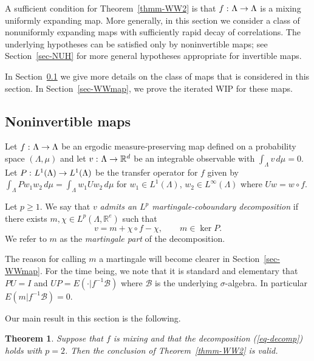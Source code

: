 \documentclass[aop,MSNbibl,seceqn,dvips]{arximspdf}
\newcommand{\eqref}[1]{(\ref{#1})}
\newtheorem{thmm}{Theorem}[section]
\newcommand{\R}{\mathbb{R}}
\begin{document}
A sufficient condition for Theorem~\ref{thmm-WW2}
is that $f\dvtx\Lambda\to\Lambda$ is a mixing uniformly expanding map.
More generally, in this section we consider a class of nonuniformly
expanding maps with sufficiently rapid decay of correlations.
The underlying hypotheses can be satisfied only by noninvertible maps;
see Section~\ref{sec-NUH} for more general hypotheses appropriate for
invertible maps.

In Section~\ref{sec-mild} we give more details on the class of maps
that is considered in this section. In Section~\ref{sec-WWmap}, we
prove the iterated WIP for these maps.

\subsection{Noninvertible maps}
\label{sec-mild}

Let $f\dvtx\Lambda\to\Lambda$ be an ergodic measure-preserving map defined
on a probability space $(\Lambda,\mu)$ and let $v\dvtx\Lambda\to\R
^d$ be an
integrable observable with $\int_\Lambda v \,d\mu=0$.
Let $P\dvtx L^1(\Lambda)\to L^1(\Lambda)$ be the transfer operator
for $f$
given by
$\int_\Lambda Pw_1 w_2 \,d\mu=\int_\Lambda w_1 Uw_2 \,d\mu$ for
$w_1\in L^1(\Lambda)$,
$w_2\in L^\infty(\Lambda)$ where $Uw=w\circ f$.

\begin{defn} \label{def-decomp}
Let $p\ge1$.
We say that $v$ \emph{admits an $L^p$ martingale-coboundary decomposition}
if there exists $m,\chi\in L^p(\Lambda,\R^e)$ such that
%
\begin{equation}
\label{eq-decomp} v=m+\chi\circ f-\chi,\qquad m\in\ker P.
\end{equation}
%
We refer to $m$ as the \emph{martingale part} of the decomposition.
\end{defn}

\begin{rmk} \label{rmk-decomp}
The reason for calling $m$ a martingale will become clearer in
Section~\ref{sec-WWmap}.
For the time being, we note that it is standard and elementary that
$PU=I$ and
$UP=E( \cdot|f^{-1}\mathcal{B})$
where $\mathcal{B}$ is the underlying $\sigma$-algebra.
In particular
$E(m|f^{-1}\mathcal{B})=0$.
\end{rmk}

Our main result in this section is the following.

\begin{thmm} \label{thmm-WWmap} Suppose that $f$ is mixing and
that the decomposition \eqref{eq-decomp} holds with $p=2$.
Then the conclusion of Theorem~\ref{thmm-WW2} is valid.
\end{thmm}
\end{document}
